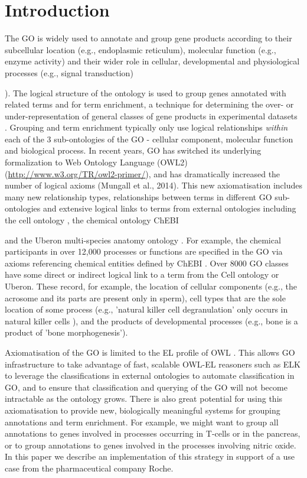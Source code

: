 \documentclass[runningheads,a4paper]{llncs}
\begin{document}
\section{Introduction}


The \acf{GO} is widely used to annotate and group gene products according to their subcellular location (e.g., endoplasmic reticulum), molecular function (e.g., enzyme activity) and their wider role in cellular, developmental and physiological processes (e.g., signal transduction) {\cite{GO2015}). The logical structure of the ontology is used to group genes annotated with related terms and for term enrichment, a technique for determining the over- or under-representation of general classes of gene products in experimental datasets \cite{Shah2012}. Grouping and term enrichment typically only use logical relationships \textit{within} each of the 3 sub-ontologies of the \ac{GO} - cellular component, molecular function and biological process.
%
In recent years, \ac{GO} has switched its underlying formalization to Web Ontology Language (OWL2) (\url{http://www.w3.org/TR/owl2-primer/}), and has dramatically increased the number of logical axioms (Mungall et al., 2014). This new axiomatisation includes many new relationship types, relationships between terms in different \ac{GO} sub-ontologies and extensive logical links to terms from external ontologies including the cell ontology \cite{Meehan2011}, the chemical ontology ChEBI {\cite{Hastings2013} and the Uberon multi-species anatomy ontology \cite{Haendel2014}.  For example, the chemical participants in over 12,000 processes or functions are specified in the \ac{GO} via axioms referencing chemical entities defined by ChEBI \cite{Hill2013}. Over 8000 \ac{GO} classes have some direct or indirect logical link to a term from the Cell ontology or Uberon. These record, for example, the location of cellular components (e.g., the acrosome and its parts are present only in sperm), cell types that are the sole location of some process (e.g., 'natural killer cell degranulation' only occurs in natural killer cells ), and the products of developmental processes (e.g., bone is a product of 'bone morphogenesis').

Axiomatisation of the \ac{GO} is limited to the EL profile of OWL \cite{Mungall2014}. This allows \ac{GO} infrastructure to take advantage of fast, scalable OWL-EL reasoners such as ELK \cite{kazakov2012} to leverage the classifications in external ontologies to automate classification in \ac{GO}, and to ensure that classification and querying of the \ac{GO} will not become intractable as the ontology grows.  There is also great potential for using this axiomatisation to provide new, biologically meaningful systems for grouping annotations and term enrichment.  For example, we might want to group all annotations to genes involved in processes occurring in T-cells or in the pancreas, or to group annotations to genes involved in the processes involving nitric oxide.  In this paper we describe an implementation of this strategy in support of a use case from the pharmaceutical company Roche.

}}
\end{document}
